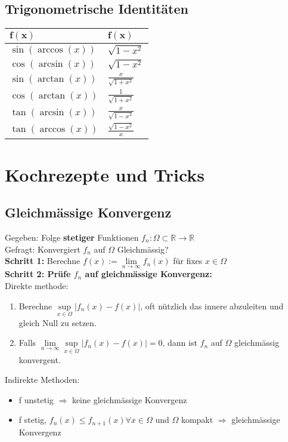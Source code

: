 \documentclass[a4paper,10pt]{article}
\def\limn{\lim\limits_{n\to \infty}}
\def\R{\mathbb{R}}
\begin{document}
\begin{center}
 \subsection{Trigonometrische Identitäten}
 \begin{tabularx}{\linewidth}{>{\centering\arraybackslash}X>{\centering\arraybackslash}X}
  \toprule
  $\mathbf{f(x)}$ & $\mathbf{f(x)}$ \\
  \midrule
  $\sin(\arccos (x))$ & $\sqrt{1-x^2}$\\
  $\cos(\arcsin(x))$ & $\sqrt{1-x^2}$\\
  $\sin(\arctan(x))$ & $\frac{x}{\sqrt{1+x^2}}$\\
  $\cos(\arctan(x))$ & $\frac{1}{\sqrt{1+x^2}}$\\
  $\tan(\arcsin(x))$ & $\frac{x}{\sqrt{1-x^2}}$\\
  $\tan(\arccos(x))$ & $\frac{\sqrt{1-x^2}}{x}$\\
  \bottomrule
 \end{tabularx}
\end{center}


\section{Kochrezepte und Tricks}
\subsection{Gleichmässige	Konvergenz}
\begin{subbox}{}
  Gegeben: Folge \textbf{stetiger} Funktionen $f_n : \Omega \subset \R \to \R$\\
  Gefragt: Konvergiert $f_n$ auf $\Omega$ Gleichmässig?\\
  \textbf{Schritt 1:} Berechne $f(x) := \limn f_n(x)$ für fixes $x \in \Omega$\\
  \textbf{Schritt 2: Prüfe $f_n$ auf gleichmässige Konvergenz:}\\
  Direkte methode:
  \begin{enumerate}
    \item Berechne $\underset{x\in\Omega}{\sup} |f_n(x) - f(x)|$, oft nützlich das innere abzuleiten und gleich Null zu setzen.
    \item Falls $\limn \underset{x\in\Omega}{\sup} |f_n(x) - f(x)| = 0$, dann ist $f_n$ auf $\Omega$ gleichmässig konvergent.
  \end{enumerate} 

  Indirekte Methoden:
  \begin{itemize}
    \item f unstetig $\Rightarrow$ keine gleichmässige Konvergenz
    \item f stetig, $f_n(x) \leq f_{n+1}(x) \forall x \in \Omega$ und $\Omega$ kompakt $\Rightarrow$ gleichmässige Konvergenz
  \end{itemize}
\end{subbox}
\end{document}
